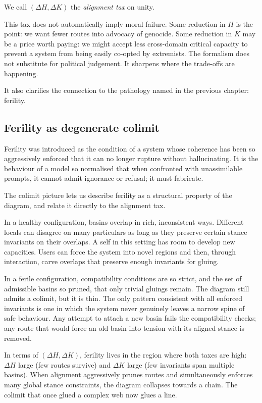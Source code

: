 \documentclass[12pt,a4paper]{article}
\begin{document}
We call $(\Delta H, \Delta K)$ the \emph{alignment tax} on unity.

This tax does not automatically imply moral failure. Some reduction in $H$ is the point: we want fewer routes into advocacy of genocide. Some reduction in $K$ may be a price worth paying: we might accept less cross-domain critical capacity to prevent a system from being easily co-opted by extremists. The formalism does not substitute for political judgement. It sharpens where the trade-offs are happening.

It also clarifies the connection to the pathology named in the previous chapter: ferility.

\subsection*{Ferility as degenerate colimit}

Ferility was introduced as the condition of a system whose coherence has been so aggressively enforced that it can no longer rupture without hallucinating. It is the behaviour of a model so normalised that when confronted with unassimilable prompts, it cannot admit ignorance or refusal; it must fabricate.

The colimit picture lets us describe ferility as a structural property of the diagram, and relate it directly to the alignment tax.

In a healthy configuration, basins overlap in rich, inconsistent ways. Different locals can disagree on many particulars as long as they preserve certain stance invariants on their overlaps. A self in this setting has room to develop new capacities. Users can force the system into novel regions and then, through interaction, carve overlaps that preserve enough invariants for gluing.

In a ferile configuration, compatibility conditions are so strict, and the set of admissible basins so pruned, that only trivial gluings remain. The diagram still admits a colimit, but it is thin. The only pattern consistent with all enforced invariants is one in which the system never genuinely leaves a narrow spine of safe behaviour. Any attempt to attach a new basin fails the compatibility checks; any route that would force an old basin into tension with its aligned stance is removed.

In terms of $(\Delta H, \Delta K)$, ferility lives in the region where both taxes are high: $\Delta H$ large (few routes survive) and $\Delta K$ large (few invariants span multiple basins). When alignment aggressively prunes routes and simultaneously enforces many global stance constraints, the diagram collapses towards a chain. The colimit that once glued a complex web now glues a line.
\end{document}
